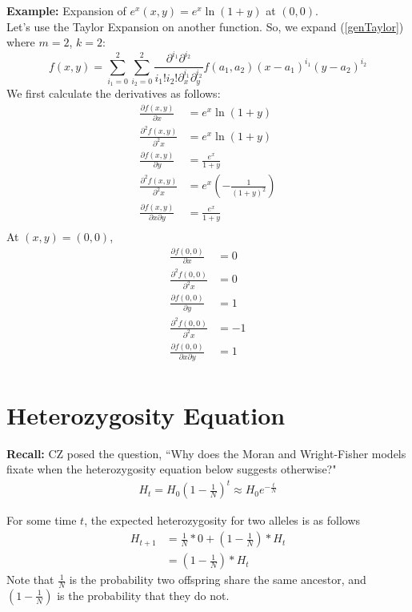 \documentclass[12pt]{extarticle}
\newcommand{\<}{\langle}
\renewcommand{\>}{\rangle}
\theoremstyle{definition}
\begin{document}
\noindent \textbf{Example:} Expansion of $e^x(x, y) = e^x \ln(1 + y)$ at $(0, 0)$.\\

\noindent Let's use the Taylor Expansion on another function. So, we expand (\ref{genTaylor}) where $m = 2$, $k = 2$:
\begin{equation}
    f(x, y) = \sum_{i_1 = 0}^2 \sum_{i_2 = 0}^2 \frac{\partial^{i_1}\partial^{i_2}}{i_1!i_2!\partial_{x}^{i_1}\partial_{y}^{i_2}}f(a_1, a_2)(x - a_1)^{i_1}(y - a_2)^{i_2}
\end{equation}
We first calculate the derivatives as follows:
\begin{align}
    \frac{\partial f(x, y)}{\partial x} &= e^x \ln(1 + y)\\
    \frac{\partial^2 f(x, y)}{\partial^2 x} &= e^x \ln(1 + y)\\
    \frac{\partial f(x, y)}{\partial y} &= \frac{e^x}{1 + y}\\
    \frac{\partial^2 f(x, y)}{\partial^2 x} &= e^x \left( -\frac{1}{(1 + y)^2}\right)\\
    \frac{\partial f(x, y)}{\partial x \partial y} &= \frac{e^x}{1 + y}\\
\end{align}
At $(x, y) = (0, 0)$, 
\begin{align}
    \frac{\partial f(0, 0)}{\partial x} &= 0\\
    \frac{\partial^2 f(0, 0)}{\partial^2 x} &= 0\\
    \frac{\partial f(0, 0)}{\partial y} &= 1\\
    \frac{\partial^2 f(0, 0)}{\partial^2 x} &= -1\\
    \frac{\partial f(0, 0)}{\partial x \partial y} &= 1\\
\end{align}

\section{Heterozygosity Equation}

\textbf{Recall:} CZ posed the question, ``Why does the Moran and Wright-Fisher models fixate when the heterozygosity equation below suggests otherwise?"
\begin{align}
    H_t = H_0(1 - \frac{1}{N})^t \approx H_0e^{-\frac{t}{N}} \label{H_0}
\end{align}

\noindent For some time $t$, the expected heterozygosity for two alleles is as follows
\begin{align}
    H_{t + 1} &= \frac{1}{N}*0 + (1 - \frac{1}{N})*H_t \nonumber \\
    &= (1 - \frac{1}{N})*H_t \label{H_t}
\end{align}
Note that $\frac{1}{N}$ is the probability two offspring share the same ancestor, and $(1 - \frac{1}{N})$ is the probability that they do not.\\
\end{document}
